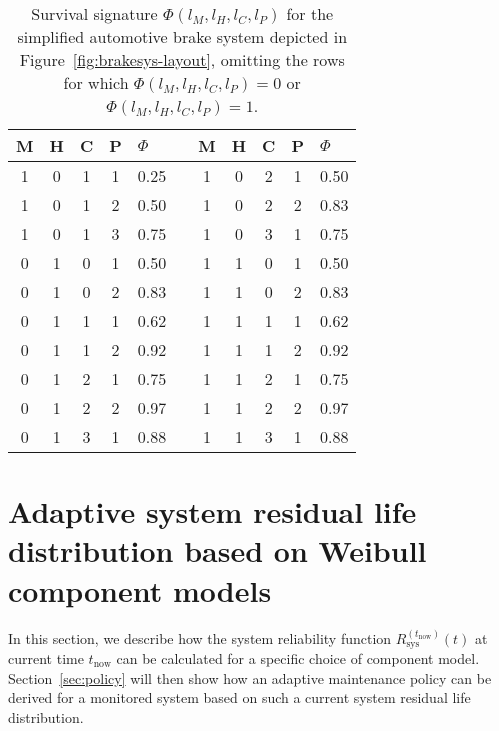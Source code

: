 \documentclass[authoryear]{elsarticle}
\def\tnow{t_\text{now}}
\newcommand{\Rsysnow}{R^{(t_\text{now})}_\text{sys}}
\begin{document}
\begin{table}
\centering
\begin{tabular}{cccclcccccl}
  \toprule
M & H & C & P & $\Phi$ & \quad & M & H & C & P & $\Phi$\\ 
  \midrule
1 & 0 & 1 & 1 & 0.25 & & 1 & 0 & 2 & 1 & 0.50 \\ 
1 & 0 & 1 & 2 & 0.50 & & 1 & 0 & 2 & 2 & 0.83 \\ 
1 & 0 & 1 & 3 & 0.75 & & 1 & 0 & 3 & 1 & 0.75 \\ 
0 & 1 & 0 & 1 & 0.50 & & 1 & 1 & 0 & 1 & 0.50 \\ 
0 & 1 & 0 & 2 & 0.83 & & 1 & 1 & 0 & 2 & 0.83 \\ 
0 & 1 & 1 & 1 & 0.62 & & 1 & 1 & 1 & 1 & 0.62 \\ 
0 & 1 & 1 & 2 & 0.92 & & 1 & 1 & 1 & 2 & 0.92 \\ 
0 & 1 & 2 & 1 & 0.75 & & 1 & 1 & 2 & 1 & 0.75 \\ 
0 & 1 & 2 & 2 & 0.97 & & 1 & 1 & 2 & 2 & 0.97 \\ 
0 & 1 & 3 & 1 & 0.88 & & 1 & 1 & 3 & 1 & 0.88 \\ 
   \bottomrule
\end{tabular}
\caption{Survival signature $\Phi(l_M, l_H, l_C, l_P)$
for the simplified automotive brake system depicted in Figure~\ref{fig:brakesys-layout},
omitting the rows for which $\Phi(l_M, l_H, l_C, l_P) = 0$ or $\Phi(l_M, l_H, l_C, l_P) = 1$.}
\label{tab:brakesys-survsign}
\end{table}


\section{Adaptive system residual life distribution based on Weibull component models}
\label{sec:adaptive-sysrel-weibull}

In this section, we describe how the system reliability function $\Rsysnow(t)$ at current time $\tnow$ 
can be calculated for a specific choice of component model.
Section~\ref{sec:policy} will then show how an adaptive maintenance policy
can be derived for a monitored system based on such a current system residual life distribution. 
\end{document}
